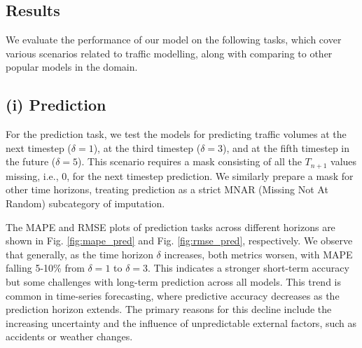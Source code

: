 \subsection{Results}

We evaluate the performance of our model on the following tasks, which cover various scenarios related to traffic modelling, along with comparing to other popular models in the domain.

\subsection*{(i) Prediction}

For the prediction task, we test the models for predicting traffic volumes at the next timestep (\(\delta = 1\)), at the third timestep (\(\delta = 3\)), and at the fifth timestep in the future (\(\delta = 5\)). This scenario requires a mask consisting of all the \(T_{n+1}\) values missing, i.e., 0, for the next timestep prediction. We similarly prepare a mask for other time horizons, treating prediction as a strict MNAR (Missing Not At Random) subcategory of imputation.

The MAPE and RMSE plots of prediction tasks across different horizons are shown in Fig. \ref{fig:mape_pred} and Fig. \ref{fig:rmse_pred}, respectively. We observe that generally, as the time horizon \(\delta\) increases, both metrics worsen, with MAPE falling 5-10\% from \(\delta=1\) to \(\delta=3\). This indicates a stronger short-term accuracy but some challenges with long-term prediction across all models. This trend is common in time-series forecasting, where predictive accuracy decreases as the prediction horizon extends. The primary reasons for this decline include the increasing uncertainty and the influence of unpredictable external factors, such as accidents or weather changes.

